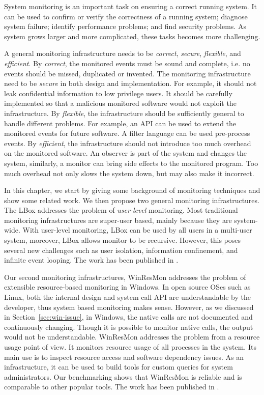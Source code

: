 System monitoring is an important task on ensuring a correct running
system.
It can be used to confirm or verify the correctness of a running system;
diagnose system failure;
identify performance problems;
and find security problems.
As system grows larger and more complicated, these tasks becomes more challenging.

A general monitoring infrastructure needs to be
{\em correct}, {\em secure}, {\em flexible}, and {\em efficient}.
By {\em correct}, the monitored events must be sound and complete, i.e.
no events should be missed, duplicated or invented.
The monitoring infrastructure need to be {\em secure} in both design and implementation.
For example, it should not leak confidential information to low privilege users.
It should be carefully implemented so that a malicious monitored
software would not exploit the infrastructure.
By {\em flexible}, the infrastructure should be sufficiently general to
handle different problems.
For example, an API can be used to extend the monitored events for future software.
A filter language can be used pre-process events.
By {\em efficient}, the infrastructure should not introduce too much
overhead on the monitored software.
An observer is part of the system and changes the system, similarly,
a monitor can bring side effects to the monitored program.
Too much overhead not only slows the system down, but may also make
it incorrect.

In this chapter, we start by giving some background of monitoring techniques
and show some related work.
We then propose two general monitoring infrastructures.
The LBox addresses the problem of {\em user-level} monitoring.
Most traditional monitoring infrastructures are super-user based,
mainly because they are system-wide.
With user-level monitoring, LBox can be used by all users in a multi-user
system, moreover, LBox allows monitor to be recursive.
However, this poses several new challenges such as
user isolation, information confinement, and infinite event looping.
The work has been published in \cite{wu2005user}.

Our second monitoring infrastructures, WinResMon addresses the problem
of extensible resource-based monitoring in Windows.
In open source OSes such as Linux,
both the internal design and system call API are understandable by
the developer, thus system based monitoring makes sense.
However, as we discussed in Section~\ref{sec:win-issue},
in Windows, the native calls are not documented and continuously
changing.
Though it is possible to monitor native calls, the output would not be
understandable.
WinResMon addresses the problem from a resource usage point of view.
It monitors resource usage of all processes in the system.
Its main use is to inspect resource access and software dependency issues.
As an infrastructure, it can be used to build tools for custom queries
for system administrators.
Our benchmarking shows that WinResMon is reliable and is
comparable to other popular tools.
The work has been published in \cite{ramnath2006winresmon}.

